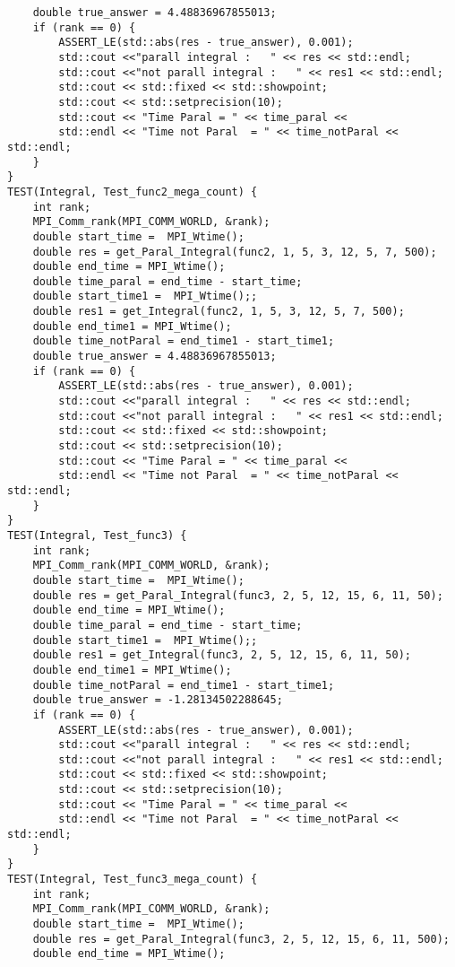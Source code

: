 \documentclass{report}
\begin{document}
\begin{lstlisting}
    double true_answer = 4.48836967855013;
    if (rank == 0) {
        ASSERT_LE(std::abs(res - true_answer), 0.001);
        std::cout <<"parall integral :   " << res << std::endl;
        std::cout <<"not parall integral :   " << res1 << std::endl;
        std::cout << std::fixed << std::showpoint;
        std::cout << std::setprecision(10);
        std::cout << "Time Paral = " << time_paral <<
        std::endl << "Time not Paral  = " << time_notParal << std::endl;
    }
}
TEST(Integral, Test_func2_mega_count) {
    int rank;
    MPI_Comm_rank(MPI_COMM_WORLD, &rank);
    double start_time =  MPI_Wtime();
    double res = get_Paral_Integral(func2, 1, 5, 3, 12, 5, 7, 500);
    double end_time = MPI_Wtime();
    double time_paral = end_time - start_time;
    double start_time1 =  MPI_Wtime();;
    double res1 = get_Integral(func2, 1, 5, 3, 12, 5, 7, 500);
    double end_time1 = MPI_Wtime();
    double time_notParal = end_time1 - start_time1;
    double true_answer = 4.48836967855013;
    if (rank == 0) {
        ASSERT_LE(std::abs(res - true_answer), 0.001);
        std::cout <<"parall integral :   " << res << std::endl;
        std::cout <<"not parall integral :   " << res1 << std::endl;
        std::cout << std::fixed << std::showpoint;
        std::cout << std::setprecision(10);
        std::cout << "Time Paral = " << time_paral <<
        std::endl << "Time not Paral  = " << time_notParal << std::endl;
    }
}
TEST(Integral, Test_func3) {
    int rank;
    MPI_Comm_rank(MPI_COMM_WORLD, &rank);
    double start_time =  MPI_Wtime();
    double res = get_Paral_Integral(func3, 2, 5, 12, 15, 6, 11, 50);
    double end_time = MPI_Wtime();
    double time_paral = end_time - start_time;
    double start_time1 =  MPI_Wtime();;
    double res1 = get_Integral(func3, 2, 5, 12, 15, 6, 11, 50);
    double end_time1 = MPI_Wtime();
    double time_notParal = end_time1 - start_time1;
    double true_answer = -1.28134502288645;
    if (rank == 0) {
        ASSERT_LE(std::abs(res - true_answer), 0.001);
        std::cout <<"parall integral :   " << res << std::endl;
        std::cout <<"not parall integral :   " << res1 << std::endl;
        std::cout << std::fixed << std::showpoint;
        std::cout << std::setprecision(10);
        std::cout << "Time Paral = " << time_paral <<
        std::endl << "Time not Paral  = " << time_notParal << std::endl;
    }
}
TEST(Integral, Test_func3_mega_count) {
    int rank;
    MPI_Comm_rank(MPI_COMM_WORLD, &rank);
    double start_time =  MPI_Wtime();
    double res = get_Paral_Integral(func3, 2, 5, 12, 15, 6, 11, 500);
    double end_time = MPI_Wtime();

\end{lstlisting}
\end{document}
